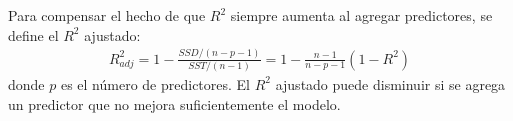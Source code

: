 \begin{observacion}[R² ajustado]
	Para compensar el hecho de que $R^2$ siempre aumenta al agregar predictores, se define el $R^2$ ajustado:
	\begin{align}
		R^2_{adj} = 1 - \frac{SSD/(n-p-1)}{SST/(n-1)} = 1 - \frac{n-1}{n-p-1}(1 - R^2)
	\end{align}
	donde $p$ es el número de predictores. El $R^2$ ajustado puede disminuir si se agrega un predictor que no mejora suficientemente el modelo.
\end{observacion}

% 
% 